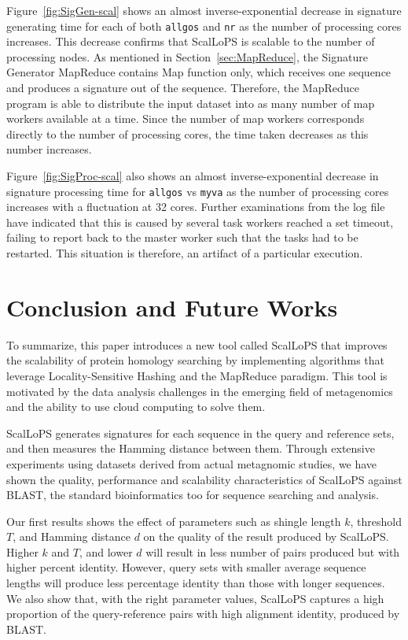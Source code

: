 \documentclass[titlepage]{csetr}
\begin{document}
Figure~\ref{fig:SigGen-scal} shows an almost inverse-exponential decrease in signature generating time for each of both \texttt{allgos} and \texttt{nr} as the number of processing cores increases. This decrease confirms that ScalLoPS is scalable to the number of processing nodes. As mentioned in Section~\ref{sec:MapReduce}, the Signature Generator MapReduce contains Map function only, which receives one sequence and produces a signature out of the sequence. Therefore, the MapReduce program is able to distribute the input dataset into as many number of map workers available at a time. Since the number of map workers corresponds directly to the number of processing cores, the time taken decreases as this number increases. 



Figure~\ref{fig:SigProc-scal} also shows an almost inverse-exponential decrease in signature processing time for \texttt{allgos} vs \texttt{myva} as the number of processing cores increases with a fluctuation at 32 cores. Further examinations from the log file have indicated that this is caused by several task workers reached a set timeout, failing to report back to the master worker such that the tasks had to be restarted. This situation is therefore, an artifact of a particular execution.





\section{Conclusion and Future Works}
\label{sec:FutureWorks}
To summarize, this paper introduces a new tool called ScalLoPS that improves the scalability of protein homology searching by implementing algorithms that leverage Locality-Sensitive Hashing and the MapReduce paradigm. This tool is motivated by the data analysis challenges in the emerging field of metagenomics and the ability to use cloud computing to solve them. 

ScalLoPS generates signatures for each sequence in the query and reference sets, and then measures the Hamming distance between them. Through extensive experiments using datasets derived from actual metagnomic studies, we have shown the quality, performance and scalability characteristics of ScalLoPS against BLAST, the standard bioinformatics too for sequence searching and analysis. 

Our first results shows the effect of parameters such as shingle length $k$, threshold $T$, and Hamming distance $d$ on the quality of the result produced by ScalLoPS. Higher $k$ and $T$, and lower $d$ will result in less number of pairs produced but with higher percent identity.  However, query sets with smaller average sequence lengths will produce less percentage identity than those with longer sequences. We also show that, with the right parameter values, ScalLoPS captures a high proportion of the query-reference pairs with high alignment identity, produced by BLAST. 
\end{document}
